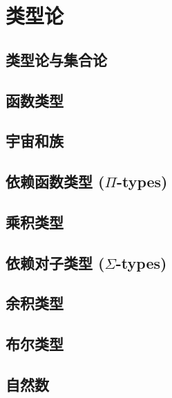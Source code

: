 \chapter{类型论}
\label{cha:typetheory}

\section{类型论与集合论}
\label{sec:types-vs-sets}


\section{函数类型}
\label{sec:function-types}


\section{宇宙和族}
\label{sec:universes}


\section{依赖函数类型 (\texorpdfstring{$\Pi$}{Π}-types)}
\label{sec:pi-types}


\section{乘积类型}
\label{sec:finite-product-types}


\section{依赖对子类型 (\texorpdfstring{$\Sigma$}{Σ}-types)}
\label{sec:sigma-types}


\section{余积类型}
\label{sec:coproduct-types}


\section{布尔类型}
\label{sec:type-booleans}


\section{自然数}
\label{sec:inductive-types}



